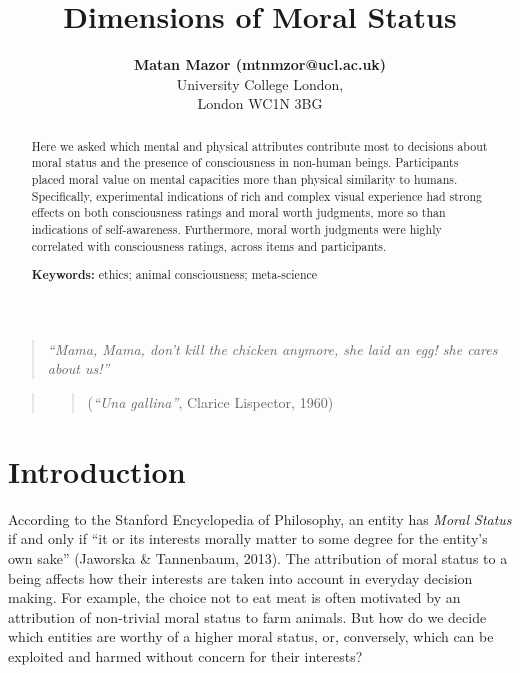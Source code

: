\documentclass[10pt, letterpaper]{article}
\title{Dimensions of Moral Status}
\author{{\large \bf Matan Mazor (mtnmzor@ucl.ac.uk)}  \AND {\large \bf Arianna Risoli (arianna.risoli.18@ucl.ac.uk)} \AND {\large \bf Anna Eberhardt (anna.everhardt.18@ucl.ac.uk)} \AND {\large \bf Stephen M. Fleming (stephen.fleming@ucl.ac.uk)} \\ University College London, \\ London WC1N 3BG}
\begin{document}
\maketitle

\begin{abstract}
Here we asked which mental and physical attributes contribute most to
decisions about moral status and the presence of consciousness in
non-human beings. Participants placed moral value on mental capacities
more than physical similarity to humans. Specifically, experimental
indications of rich and complex visual experience had strong effects on
both consciousness ratings and moral worth judgments, more so than
indications of self-awareness. Furthermore, moral worth judgments were
highly correlated with consciousness ratings, across items and
participants.

\textbf{Keywords:}
ethics; animal consciousness; meta-science
\end{abstract}

\begin{quote}
\emph{``Mama, Mama, don't kill the chicken anymore, she laid an egg! she
cares about us!''}
\end{quote}

\begin{quote}
\begin{quote}
(\emph{``Una gallina''}, Clarice Lispector, 1960)
\end{quote}
\end{quote}

\hypertarget{introduction}{%
\section{Introduction}\label{introduction}}

According to the Stanford Encyclopedia of Philosophy, an entity has
\emph{Moral Status} if and only if ``it or its interests morally matter
to some degree for the entity's own sake'' (Jaworska \& Tannenbaum,
2013). The attribution of moral status to a being affects how their
interests are taken into account in everyday decision making. For
example, the choice not to eat meat is often motivated by an attribution
of non-trivial moral status to farm animals. But how do we decide which
entities are worthy of a higher moral status, or, conversely, which can
be exploited and harmed without concern for their interests?
\end{document}
